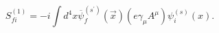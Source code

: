 \begin{equation}
S_{fi}^{\left( 1\right) }=-i \int d^{4}x\overline{\psi}
_{f}^{\left( s^{\prime }\right) }(\vec{x})\left(e\gamma _{\mu }A^{\mu }\right)
\psi_{i}^{\left( s\right) }(x).
\end{equation}

